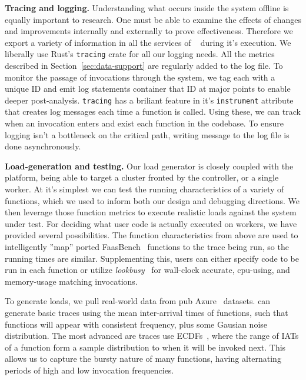 \textbf{Tracing and logging.}
Understanding what occurs inside the system offline is equally important to research.
One must be able to examine the effects of changes and improvements internally and externally to prove effectiveness.
Therefore we export a variety of information in all the services of \sysname~ during it's execution.
We liberally use Rust's \texttt{tracing} crate for all our logging needs.
All the metrics described in Section~\ref{sec:data-support} are regularly added to the log file.
To monitor the passage of invocations through the system, we tag each with a unique ID and emit log statements container that ID at major points to enable deeper post-analysis.
\texttt{tracing} has a briliant feature in it's \texttt{instrument} attribute that creates log messages each time a function is called.
Using these, we can track when an invocation enters and exist each function in the codebase.
To ensure logging isn't a bottleneck on the critical path, writing message to the log file is done asynchronously.


\textbf{Load-generation and testing.}
Our load generator is closely coupled with the platform, being able to target a cluster fronted by the controller, or a single worker.
At it's simplest we can test the running characteristics of a variety of functions, which we used to inform both our design and debugging directions.
We then leverage those function metrics to execute realistic loads against the system under test.
For deciding what user code is actually executed on workers, we have provided several possibilities.
The function characteristics from above are used to intelligently ''map'' ported FaasBench~\cite{} functions to the trace being run, so the running times are similar.
Supplementing this, users can either specify code to be run in each function or utilize \emph{lookbusy}~\cite{} for wall-clock accurate, cpu-using, and memory-usage matching invocations.


To generate loads, we pull real-world data from pub Azure~\cite{} datasets.
\sysname{} can generate basic traces using the mean inter-arrival times of functions, such that functions will appear with consistent frequency, plus some Gausian noise distribution.
The most advanced are traces use ECDFs~\cite{}, where the range of IATs of a function form a sample distribution to when it will be invoked next.
This allows us to capture the bursty nature of many functions, having alternating periods of high and low invocation frequencies.




